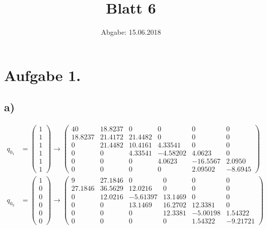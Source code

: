 

\title{Blatt 6}
\date{
  Abgabe: 15.06.2018
}



\parindent0mm
\section{Aufgabe 1.}
\subsection{a)}

\begin{align}
q_{0_1} &=
\begin{pmatrix}
  1\\
  1\\
  1\\
  1\\
  1\\
  1
\end{pmatrix}
\rightarrow
\begin{pmatrix}
  40    & 18.8237 &     0 &        0 &        0  &       0\\
18.8237 & 21.4172 & 21.4482 &        0 &        0  &       0\\
   0    & 21.4482 & 10.4161 &  4.33541 &        0  &       0\\
   0    &    0    & 4.33541 & -4.58202 &   4.0623  &       0\\
   0    &    0    &    0    &  4.0623  & -16.5567  &  2.0950\\
   0    &    0    &    0    &     0    &  2.09502  & -8.6945
\end{pmatrix}
\\
q_{0_2} &=
\begin{pmatrix}
  1\\
  0\\
  0\\
  0\\
  0\\
  0
\end{pmatrix}
\rightarrow
\begin{pmatrix}
  9    &  27.1846 &       0 &       0 &       0 &       0\\
27.1846&  36.5629 & 12.0216 &       0 &       0 &       0\\
  0    &  12.0216 &-5.61397 & 13.1469 &       0 &       0\\
  0    &    0     & 13.1469 & 16.2702 & 12.3381 &       0\\
  0    &    0     &   0     & 12.3381 &-5.00198 & 1.54322\\
  0    &    0     &   0     &   0     & 1.54322 &-9.21721
\end{pmatrix}
\end{align}

